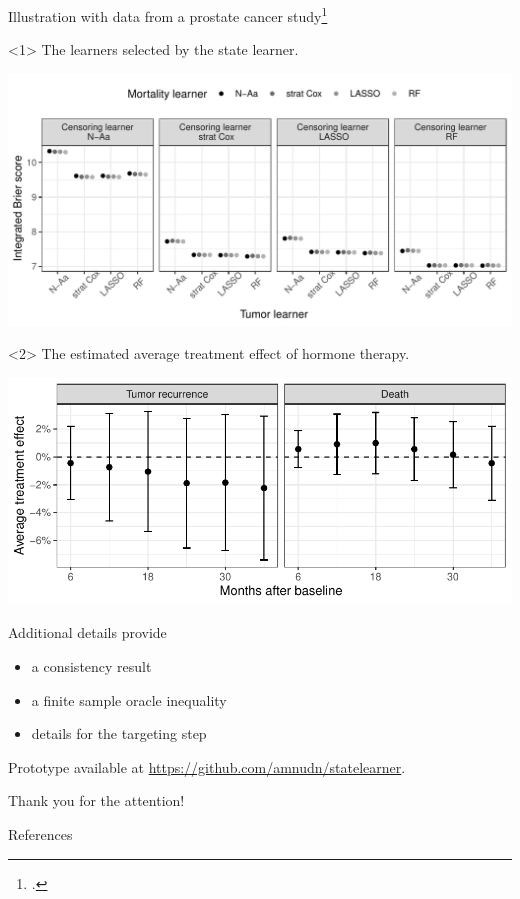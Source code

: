 \documentclass[smaller]{beamer}\usepackage{listings}
\newcommand{\1}{\mathds{1}}
\begin{document}
\begin{frame}[label={sec:org0ebe6cf}]{Illustration with data from a prostate cancer study\footnote{\cite{kattan2000pretreatment}.}}
\begin{onlyenv}<1>
The learners selected by the state learner.

\begin{center}
\includegraphics[width=1\textwidth]{./real-data-state-learner.pdf}
\end{center}
\end{onlyenv}

\begin{onlyenv}<2>
The estimated average treatment effect of hormone therapy.

\vfill

\begin{center}
\includegraphics[width=1\textwidth]{./real-data-target.pdf}
\end{center}
\end{onlyenv}
\end{frame}

\begin{frame}[label={sec:org84bcd9c}]{Additional details}
\cite{munch2024state} provide
\begin{itemize}
\item a consistency result
\item a finite sample oracle inequality
\item details for the targeting step
\end{itemize}

\vfill

Prototype available at \url{https://github.com/amnudn/statelearner}.

\vfill

\flushright \color{bblue} Thank you for the attention!
\end{frame}


\begin{frame}[label={sec:org22d632a}]{References}
\footnotesize 
\end{frame}
\end{document}
